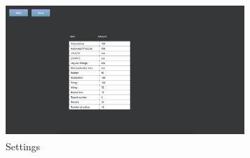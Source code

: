 \begin{figure}[!h]
\begin{center}
\includegraphics[width=9cm, height=5cm]{figures/settings-change}
\end{center}
\caption{Settings}
\label{fig:settings-change}
\end{figure}
